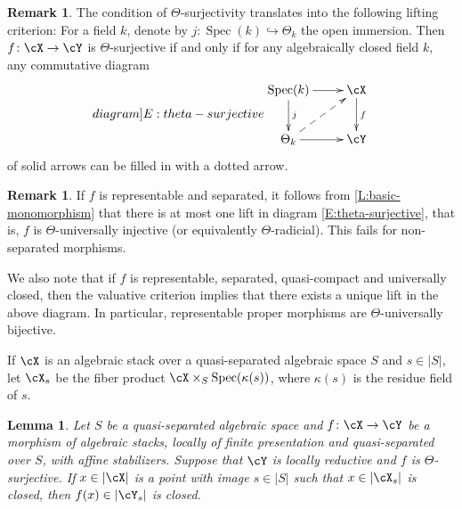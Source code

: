 \documentclass[a4paper]{amsart}
\numberwithin{equation}{section}
\theoremstyle{plain}
\newtheorem{lem}[thm]{Lemma}
\theoremstyle{definition}
\newtheorem{rem}[thm]{Remark}
\DeclareMathOperator{\Spec}{Spec}
\newcommand{\hookarr}{\hookrightarrow}
\newcommand{\co}{\colon}
\begin{document}
\begin{rem}  \label{R:theta-surjective-valuative-criterion}
The condition of $\Theta$-surjectivity translates into the following lifting criterion:  For a field $k$, denote by $j \co \Spec(k) \hookarr \Theta_k$ the open immersion.  Then $f \co \cX \to \cY$ is $\Theta$-surjective if and only if for any algebraically closed field $k$, any commutative diagram
\begin{equation} \label[diagram]{E:theta-surjective}
\begin{split}
\xymatrix{
\Spec(k) \ar[d]^{j} \ar[r]		& \cX   \ar[d]^f\\
 \Theta_k \ar[r]	\ar@{-->}[ur]		& \cY
} \end{split}
\end{equation}
of solid arrows can be filled in with a dotted arrow.
\end{rem}

\begin{rem} \label{R:theta-surjective-integral-morphism}
If $f$ is representable and separated, it follows from \eqref{L:basic-monomorphism} that there is at most one lift in diagram \eqref{E:theta-surjective}, that is, $f$ is $\Theta$-universally injective (or equivalently $\Theta$-radicial). This fails for non-separated morphisms. 

We also note that if $f$ is representable, separated, quasi-compact and universally closed, then the valuative criterion implies that there exists a unique lift in the above diagram.  In particular, representable proper morphisms are $\Theta$-universally bijective.
\end{rem}






If $\cX$ is an algebraic stack over a quasi-separated algebraic space $S$ and $s \in |S|$, let $\cX_s$ be the fiber product $\cX \times_S \Spec(\kappa(s))$, where $\kappa(s)$ is the residue field of $s$.

\begin{lem} \label{L:closed-to-closed} 
Let $S$ be a quasi-separated algebraic space and $f \co \cX \to \cY$ be a morphism of algebraic stacks, locally of finite presentation and quasi-separated over $S$, with affine stabilizers.  Suppose that $\cY$ is locally reductive and $f$ is $\Theta$-surjective.  If $x \in |\cX|$ is a point with image $s \in |S|$ such that $x \in |\cX_s|$ is closed, then $f(x) \in |\cY_s|$ is closed.
\end{lem}
\end{document}
